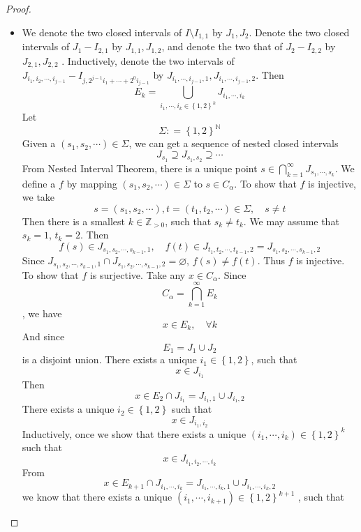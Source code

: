 \documentclass[../main.tex]{subfiles}
\begin{document}
\begin{proof}
\begin{itemize}
   \item We denote the two closed intervals of \(  I\setminus I_{1,1}  \) by \( J_1 , J_2 \). Denote the two closed intervals of \(  J_1-I_{2,1}  \) by  \(  J_{1,1}, J_{1,2}  \), and denote the two that of \(  J_{2}-I_{2,2}  \)  by \(  J_{2,1}, J_{2,2}  \) . Inductively, denote the two intervals of \(  J_{i_1,i_2,\cdots ,i_{j-1}}-I_{j,2^{j-1}i_1+ \cdots + 2^{0}i_{j-1}}  \)     by \(  J_{i_1,\cdots ,i_{j-1},1}, J_{i_1,\cdots ,i_{j-1},2}  \). Then \[
   E_{k}= \bigcup _{i_1,\cdots ,i_{k}\in \left\{ 1,2 \right\}^{k}}J_{i_1,\cdots ,i_{k}}
   \] Let \[
    \Sigma : = \left\{ 1,2 \right\}^{\mathbb{N} }
   \]Given a \(  \left( s_1,s_2,\cdots  \right)\in  \Sigma    \), we can get a sequence of nested closed intervals \[
   J_{s_1}\supseteq J_{s_1,s_2}\supseteq \cdots 
   \] From Nested Interval Theorem, there is a unique point \(  s \in \bigcap_{k= 1}^{\infty}J_{s_1,\cdots ,s_{k}}   \). We define a \(  f  \) by mapping \(  \left( s_1,s_2,\cdots  \right) \in  \Sigma   \) to \(  s \in C_{\alpha }  \).
   To show that  \(  f   \) is injective, we take  \[
   s= \left( s_1,s_2,\cdots  \right) , t = \left( t_1,t_2,\cdots  \right) \in  \Sigma , \quad s\neq t  
   \]     Then there is a smallest \(  k \in \mathbb{Z} _{> 0}  \), such that \(  s_{k}\neq t_{k}  \). We may assume that \(  s_{k}= 1  \), \(  t_{k}= 2  \).     Then \[
   f\left( s \right)\in J_{s_1,s_2,\cdots ,s_{k-1},1},\quad f\left( t \right)\in J_{t_1,t_2,\cdots ,t_{k-1},2}= J_{s_1,s_2,\cdots ,s_{k-1},2}  
   \] Since \(  J_{s_1,s_2,\cdots ,s_{k-1},1}\cap J_{s_1,s_2,\cdots ,s_{k-1},2}= \varnothing  \), \(  f\left( s \right)\neq f\left( t \right)    \). Thus \(  f  \) is injective.   
   To show that \(  f  \) is surjective. Take any \(  x \in C_{\alpha }  \). Since \[
   C_{\alpha }= \bigcap_{k = 1}^{\infty}E_{k} 
   \] , we have \[
   x \in E_{k},\quad \forall k
   \] And since \[
  E_1= J_{1}\cup J_2
   \] is a disjoint union. There exists a unique \(  i_1\in \left\{ 1,2 \right\}  \), such that \[
   x \in J_{i_1}
   \]  Then \[
   x \in E_2\cap J_{i_1}=J_{i_1,1}\cup J_{i_1,2}
   \]There exists a unique \(  i_2\in \left\{ 1,2 \right\}  \) such that \[
   x \in J_{i_1,i_2}
   \] Inductively, once we show that there exists a unique \( \left( i_1,\cdots ,i_{k} \right) \in \left\{ 1,2 \right\}^{k}  \) such that \[
   x \in J_{i_1,i_2,\cdots ,i_{k}}
   \]  From \[
   x \in E_{k+ 1}\cap J_{i_1,\cdots ,i_{k}}= J_{i_1,\cdots ,i_{k},1}\cup J_{i_1,\cdots ,i_{k},2}
   \] we know that there exists a unique \( \left(  i_1,\cdots ,i_{k+ 1}  \right) \in \left\{ 1,2 \right\}^{k+ 1}  \) , such that \[
\]
\end{itemize}
\end{proof}
\end{document}
